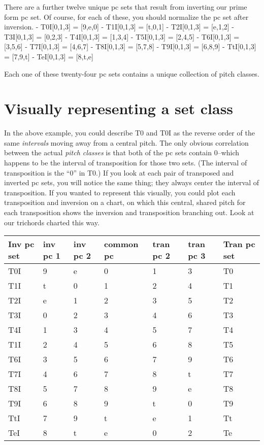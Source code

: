 \documentclass{book}
\begin{document}
There are a further twelve unique pc sets that result from inverting our prime
form pc set. Of course, for each of these, you should normalize the pc set
after inversion. - T0I{[}0,1,3{]} = {[}9,e,0{]} - T1I{[}0,1,3{]} = {[}t,0,1{]}
- T2I{[}0,1,3{]} = {[}e,1,2{]} - T3I{[}0,1,3{]} = {[}0,2,3{]} - T4I{[}0,1,3{]}
= {[}1,3,4{]} - T5I{[}0,1,3{]} = {[}2,4,5{]} - T6I{[}0,1,3{]} = {[}3,5,6{]} -
T7I{[}0,1,3{]} = {[}4,6,7{]} - T8I{[}0,1,3{]} = {[}5,7,8{]} - T9I{[}0,1,3{]} =
{[}6,8,9{]} - TtI{[}0,1,3{]} = {[}7,9,t{]} - TeI{[}0,1,3{]} = {[}8,t,e{]}

Each one of these twenty-four pc sets contains a unique collection of pitch
classes.

\hypertarget{visually-representing-a-set-class}{%
\section{Visually representing a set
class}\label{visually-representing-a-set-class}}

In the above example, you could describe T0 and T0I as the reverse order of
the same \emph{intervals} moving away from a central pitch. The only obvious
correlation between the actual \emph{pitch classes} is that both of the pc
sets contain 0--which happens to be the interval of transposition for those
two sets. (The interval of transposition is the ``0'' in T0.) If you look at
each pair of transposed and inverted pc sets, you will notice the same thing;
they always center the interval of transposition. If you wanted to represent
this visually, you could plot each transposition and inversion on a chart, on
which this central, shared pitch for each transposition shows the inversion
and transposition branching out. Look at our trichords charted this way.

\begin{longtable}[]{@{}lllllll@{}}
\toprule
Inv pc set & inv pc 1 & inv pc 2 & \textbf{common pc} & tran pc 2 & tran pc 3
& Tran pc set \\
\midrule
\endhead
T0I & 9 & e & 0 & 1 & 3 & T0 \\
T1I & t & 0 & 1 & 2 & 4 & T1 \\
T2I & e & 1 & 2 & 3 & 5 & T2 \\
T3I & 0 & 2 & 3 & 4 & 6 & T3 \\
T4I & 1 & 3 & 4 & 5 & 7 & T4 \\
T1I & 2 & 4 & 5 & 6 & 8 & T5 \\
T6I & 3 & 5 & 6 & 7 & 9 & T6 \\
T7I & 4 & 6 & 7 & 8 & t & T7 \\
T8I & 5 & 7 & 8 & 9 & e & T8 \\
T9I & 6 & 8 & 9 & t & 0 & T9 \\
TtI & 7 & 9 & t & e & 1 & Tt \\
TeI & 8 & t & e & 0 & 2 & Te \\
\bottomrule
\end{longtable}
\end{document}
